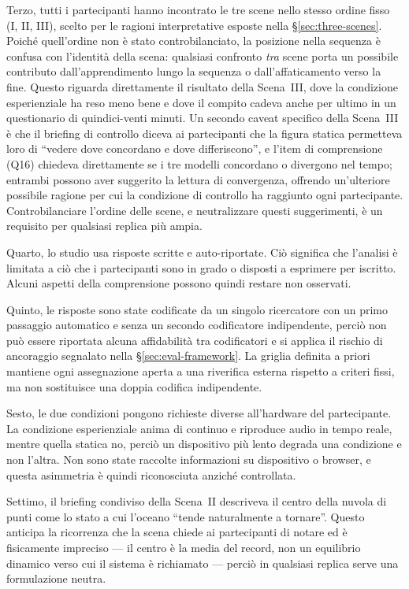 Terzo, tutti i partecipanti hanno incontrato le tre scene nello stesso ordine fisso (I, II, III), scelto per le ragioni interpretative esposte nella \S\ref{sec:three-scenes}. Poiché quell'ordine non è stato controbilanciato, la posizione nella sequenza è confusa con l'identità della scena: qualsiasi confronto \emph{tra} scene porta un possibile contributo dall'apprendimento lungo la sequenza o dall'affaticamento verso la fine. Questo riguarda direttamente il risultato della Scena~III, dove la condizione esperienziale ha reso meno bene e dove il compito cadeva anche per ultimo in un questionario di quindici-venti minuti. Un secondo caveat specifico della Scena~III è che il briefing di controllo diceva ai partecipanti che la figura statica permetteva loro di ``vedere dove concordano e dove differiscono'', e l'item di comprensione (Q16) chiedeva direttamente se i tre modelli concordano o divergono nel tempo; entrambi possono aver suggerito la lettura di convergenza, offrendo un'ulteriore possibile ragione per cui la condizione di controllo ha raggiunto ogni partecipante. Controbilanciare l'ordine delle scene, e neutralizzare questi suggerimenti, è un requisito per qualsiasi replica più ampia.

Quarto, lo studio usa risposte scritte e auto-riportate. Ciò significa che l'analisi è limitata a ciò che i partecipanti sono in grado o disposti a esprimere per iscritto. Alcuni aspetti della comprensione possono quindi restare non osservati.

Quinto, le risposte sono state codificate da un singolo ricercatore con un primo passaggio automatico e senza un secondo codificatore indipendente, perciò non può essere riportata alcuna affidabilità tra codificatori e si applica il rischio di ancoraggio segnalato nella \S\ref{sec:eval-framework}. La griglia definita a priori mantiene ogni assegnazione aperta a una riverifica esterna rispetto a criteri fissi, ma non sostituisce una doppia codifica indipendente.

Sesto, le due condizioni pongono richieste diverse all'hardware del partecipante. La condizione esperienziale anima di continuo e riproduce audio in tempo reale, mentre quella statica no, perciò un dispositivo più lento degrada una condizione e non l'altra. Non sono state raccolte informazioni su dispositivo o browser, e questa asimmetria è quindi riconosciuta anziché controllata.

Settimo, il briefing condiviso della Scena~II descriveva il centro della nuvola di punti come lo stato a cui l'oceano ``tende naturalmente a tornare''. Questo anticipa la ricorrenza che la scena chiede ai partecipanti di notare ed è fisicamente impreciso --- il centro è la media del record, non un equilibrio dinamico verso cui il sistema è richiamato --- perciò in qualsiasi replica serve una formulazione neutra.

